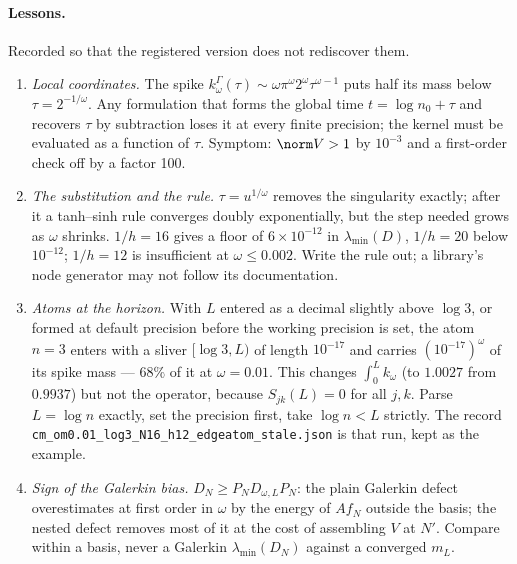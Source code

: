 \paragraph{Lessons.} Recorded so that the registered version does not
rediscover them.
\begin{enumerate}
\item \emph{Local coordinates.} The spike
$k^\Gamma_\omega(\tau)\sim\omega\pi^\omega2^\omega\tau^{\omega-1}$ puts half its
mass below $\tau=2^{-1/\omega}$. Any formulation that forms the global time
$t=\log n_0+\tau$ and recovers $\tau$ by subtraction loses it at every finite
precision; the kernel must be evaluated as a function of $\tau$. Symptom:
$\norm V>1$ by $10^{-3}$ and a first-order check off by a factor 100.
\item \emph{The substitution and the rule.} $\tau=u^{1/\omega}$ removes the
singularity exactly; after it a tanh--sinh rule converges doubly
exponentially, but the step needed grows as $\omega$ shrinks. $1/h=16$ gives a
floor of $6\times10^{-12}$ in $\lambda_{\min}(D)$, $1/h=20$ below $10^{-12}$;
$1/h=12$ is insufficient at $\omega\leq0.002$. Write the rule out; a library's
node generator may not follow its documentation.
\item \emph{Atoms at the horizon.} With $L$ entered as a decimal slightly above
$\log3$, or formed at default precision before the working precision is set,
the atom $n=3$ enters with a sliver $[\log3,L)$ of length $10^{-17}$ and
carries $(10^{-17})^\omega$ of its spike mass --- $68\%$ of it at $\omega=0.01$.
This changes $\int_0^Lk_\omega$ (to $1.0027$ from $0.9937$) but not the
operator, because $S_{jk}(L)=0$ for all $j,k$. Parse $L=\log n$ exactly, set
the precision first, take $\log n<L$ strictly. The record
\texttt{cm\_om0.01\_log3\_N16\_h12\_edgeatom\_stale.json} is that run, kept as
the example.
\item \emph{Sign of the Galerkin bias.} $D_N\geq P_ND_{\omega,L}P_N$: the plain
Galerkin defect overestimates at first order in $\omega$ by the energy of
$Af_N$ outside the basis; the nested defect removes most of it at the cost of
assembling $V$ at $N'$. Compare within a basis, never a Galerkin
$\lambda_{\min}(D_N)$ against a converged $m_L$.
\end{enumerate}
